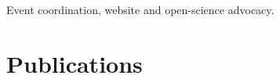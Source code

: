 \documentclass[]{deedy-resume-openfont}
\begin{document}
\begin{minipage}[t]{0.66\textwidth}
\location{\WhenBioinfPl{}}
\begin{tightemize}
\item Event coordination, website and open-science advocacy.
\end{tightemize}
\sectionsep

\section{Publications}
{\footnotesize
\PubCry{}\\[2pt]
\PubAjp{}\\[2pt]
\PubHep{}
}

\end{minipage}

\vspace*{\fill}
\noindent{\tiny \GdprNotice{}}
\end{document}
